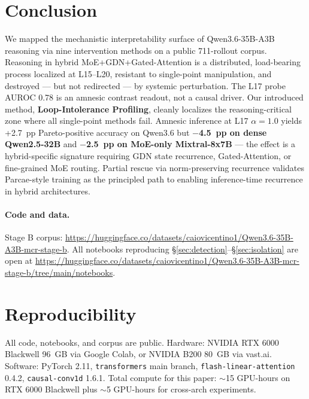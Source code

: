 \documentclass[11pt]{article}
\begin{document}
\section{Conclusion}

We mapped the mechanistic interpretability surface of Qwen3.6-35B-A3B reasoning via nine intervention methods on a public 711-rollout corpus. Reasoning in hybrid MoE+GDN+Gated-Attention is a distributed, load-bearing process localized at L15--L20, resistant to single-point manipulation, and destroyed --- but not redirected --- by systemic perturbation. The L17 probe AUROC 0.78 is an amnesic contrast readout, not a causal driver. Our introduced method, \textbf{Loop-Intolerance Profiling}, cleanly localizes the reasoning-critical zone where all single-point methods fail. Amnesic inference at L17 $\alpha=1.0$ yields +2.7~pp Pareto-positive accuracy on Qwen3.6 but \textbf{$-$4.5~pp on dense Qwen2.5-32B} and \textbf{$-$2.5~pp on MoE-only Mixtral-8x7B} --- the effect is a hybrid-specific signature requiring GDN state recurrence, Gated-Attention, or fine-grained MoE routing. Partial rescue via norm-preserving recurrence validates Parcae-style training as the principled path to enabling inference-time recurrence in hybrid architectures.

\paragraph{Code and data.} Stage B corpus: \url{https://huggingface.co/datasets/caiovicentino1/Qwen3.6-35B-A3B-mcr-stage-b}. All notebooks reproducing \S\ref{sec:detection}--\S\ref{sec:isolation} are open at \url{https://huggingface.co/datasets/caiovicentino1/Qwen3.6-35B-A3B-mcr-stage-b/tree/main/notebooks}.




\appendix
\section{Reproducibility}
All code, notebooks, and corpus are public. Hardware: NVIDIA RTX 6000 Blackwell 96~GB via Google Colab, or NVIDIA B200 80~GB via vast.ai. Software: PyTorch 2.11, \texttt{transformers} main branch, \texttt{flash-linear-attention} 0.4.2, \texttt{causal-conv1d} 1.6.1. Total compute for this paper: $\sim$15 GPU-hours on RTX 6000 Blackwell plus $\sim$5 GPU-hours for cross-arch experiments.
\end{document}
